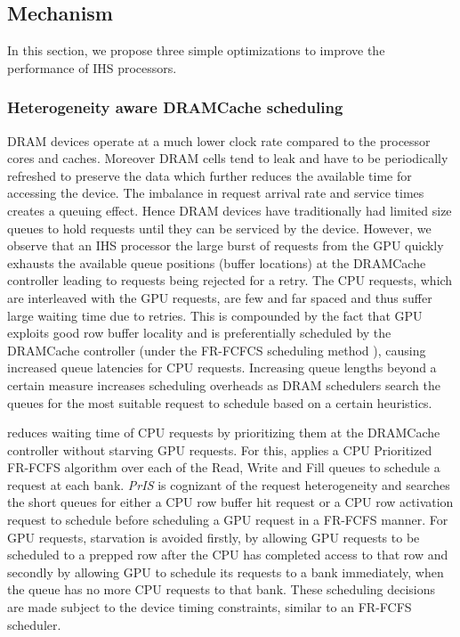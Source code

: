 \newcommand{\bypassname}{\textit{ByE }}
\newcommand{\prioname}{\textit{PrIS }}
\subsection{\cachename Mechanism} \label{mechanism}
In this section, we propose three simple optimizations to improve the performance of IHS processors.

\subsubsection{Heterogeneity aware DRAMCache scheduling}
DRAM devices operate at a much lower clock rate compared to the processor cores and caches. Moreover DRAM cells tend to leak and have to be periodically refreshed to preserve the data which further reduces the available time for accessing the device. The imbalance in request arrival rate and service times creates a queuing effect. Hence DRAM devices have traditionally had limited size queues to hold requests until they can be serviced by the device. However, we observe that an IHS processor the large burst of requests from the GPU quickly exhausts the available queue positions (buffer locations) at the DRAMCache controller leading to requests being rejected for a retry. The CPU requests, which are interleaved with the GPU requests, are few and far spaced and thus suffer large waiting time due to retries. This is compounded by the fact that GPU exploits good row buffer locality and is preferentially scheduled by the DRAMCache controller (under the FR-FCFCS scheduling method \cite{sms}), causing increased queue latencies for CPU requests. Increasing queue lengths beyond a certain measure increases scheduling overheads as DRAM schedulers search the queues for the most suitable request to schedule based on a certain heuristics.
\par \cachename reduces waiting time of CPU requests by prioritizing them at the DRAMCache controller without starving GPU requests. 
For this, \cachename applies a CPU Prioritized FR-FCFS algorithm over each of the Read, Write and Fill queues to schedule a request at each bank. 
\prioname is cognizant of the request heterogeneity and searches the short queues for either a CPU row buffer hit request or a CPU row activation request to schedule before scheduling a GPU request in a FR-FCFS manner. For GPU requests, starvation is avoided firstly, by allowing GPU requests to be scheduled to a prepped row after the CPU has completed access to that row and secondly by allowing GPU to schedule its requests to a bank immediately, when the queue has no more CPU requests to that bank. These scheduling decisions are made subject to the device timing constraints, similar to an FR-FCFS scheduler.
